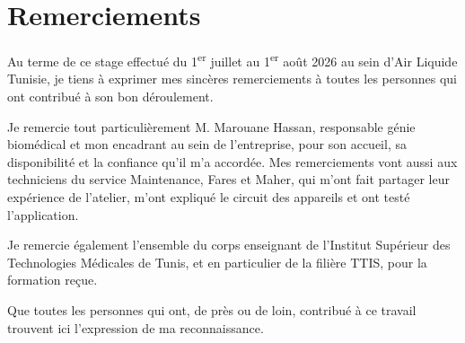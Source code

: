 \chapter*{Remerciements}

Au terme de ce stage effectué du 1\textsuperscript{er} juillet au 1\textsuperscript{er} août 2026 au sein d'Air Liquide Tunisie, je tiens à exprimer mes sincères remerciements à toutes les personnes qui ont contribué à son bon déroulement.

Je remercie tout particulièrement M. Marouane Hassan, responsable génie biomédical et mon encadrant au sein de l'entreprise, pour son accueil, sa disponibilité et la confiance qu'il m'a accordée. Mes remerciements vont aussi aux techniciens du service Maintenance, Fares et Maher, qui m'ont fait partager leur expérience de l'atelier, m'ont expliqué le circuit des appareils et ont testé l'application.

Je remercie également l'ensemble du corps enseignant de l'Institut Supérieur des Technologies Médicales de Tunis, et en particulier de la filière TTIS, pour la formation reçue.

Que toutes les personnes qui ont, de près ou de loin, contribué à ce travail trouvent ici l'expression de ma reconnaissance.

